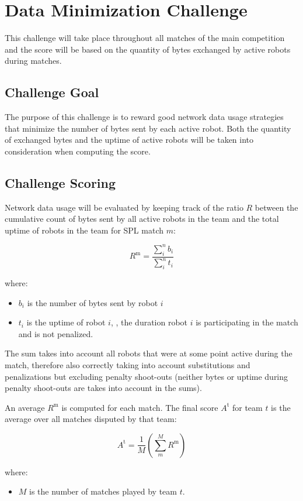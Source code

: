 \section{Data Minimization Challenge} %
This challenge will take place throughout all matches of the main competition and the score will be based on the quantity of bytes exchanged by active robots during matches. 


\subsection{Challenge Goal}
The purpose of this challenge is to reward good network data usage strategies that minimize the number of bytes sent by each active robot. Both the quantity of exchanged bytes and the uptime of active robots will be taken into consideration when computing the score.

\subsection{Challenge Scoring}
Network data usage will be evaluated by keeping track of the ratio $R$ between the cumulative count of bytes sent by all active robots in the team and the total uptime of robots in the team for SPL match $m$:

$$ R^\text{m} = \frac{\sum_{i}^n b_i}{\sum_{i}^n t_i} $$

where:
\begin{itemize}
    \item $b_i$ is the number of bytes sent by robot $i$
    \item $t_i$ is the uptime of robot $i$, \ie, the duration robot $i$ is participating in the match and is not penalized.
\end{itemize}
The sum takes into account all robots that were at some point active during the match, therefore also correctly taking into account substitutions and penalizations but excluding penalty shoot-outs (neither bytes or uptime during penalty shoot-outs are takes into account in the sums).

An average $R^\text{m}$ is computed for each match. The final score $A^\text{t}$ for team $t$ is the average over all matches disputed by that team:

$$ A^\text{t} = \frac{1}{M} \left( \sum_{m}^M R^\text{m} \right) $$

where:
\begin{itemize}
    \item $M$ is the number of matches played by team $t$.
\end{itemize}


